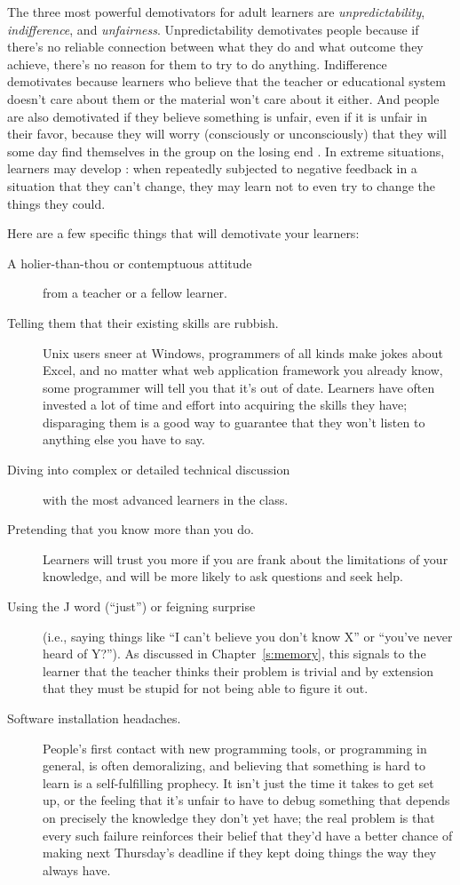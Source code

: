 The three most powerful demotivators for adult learners are
\emph{unpredictability}, \emph{indifference}, and \emph{unfairness}. Unpredictability
demotivates people because if there's no reliable connection between
what they do and what outcome they achieve, there's no reason for them
to try to do anything. Indifference demotivates because learners who
believe that the teacher or educational system doesn't care about them
or the material won't care about it either. And people are also
demotivated if they believe something is unfair, even if it is unfair in
their favor, because they will worry (consciously or unconsciously) that
they will some day find themselves in the group on the losing end
\cite{Wilk2011}. In extreme situations, learners may develop
: when
repeatedly subjected to negative feedback in a situation that they can't
change, they may learn not to even try to change the things they could.

Here are a few specific things that will demotivate your learners:

\begin{description}
\item[A holier-than-thou or contemptuous attitude]
from a teacher or a fellow learner.
\item[Telling them that their existing skills are rubbish.]
Unix users sneer at Windows, programmers of all kinds make jokes
about Excel, and no matter what web application framework you
already know, some programmer will tell you that it's out of date.
Learners have often invested a lot of time and effort into acquiring
the skills they have; disparaging them is a good way to guarantee
that they won't listen to anything else you have to say.
\item[Diving into complex or detailed technical discussion]
with the most advanced learners in the class.
\item[Pretending that you know more than you do.]
Learners will trust you more if you are frank about the limitations
of your knowledge, and will be more likely to ask questions and seek
help.
\item[Using the J word (``just'') or feigning surprise]
(i.e., saying things like ``I can't believe you don't know X'' or
``you've never heard of Y?''). As discussed in
Chapter~\ref{s:memory}, this signals to the learner that the teacher
thinks their problem is trivial and by extension that they must be
stupid for not being able to figure it out.
\item[Software installation headaches.]
People's first contact with new programming tools, or programming in
general, is often demoralizing, and believing that something is hard
to learn is a self-fulfilling prophecy. It isn't just the time it
takes to get set up, or the feeling that it's unfair to have to
debug something that depends on precisely the knowledge they don't
yet have; the real problem is that every such failure reinforces
their belief that they'd have a better chance of making next
Thursday's deadline if they kept doing things the way they always
have.
\end{description}


